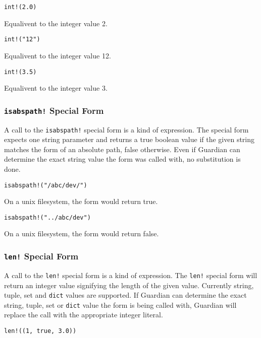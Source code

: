 {{		\begin{itemize}
		{
			\item \texttt{int!(2.0)}
			
				Equalivent to the integer value 2.
			
			\item \texttt{int!("12")}
			
				Equalivent to the integer value 12.
			
			\item \texttt{int!(3.5)}
			
				Equalivent to the integer value 3.
		}
		\end{itemize}
	}
	
	\subsubsection{\texttt{isabspath!} Special Form}
	{
		A call to the \texttt{isabspath!} special form is a kind of expression.
		The special form expects one string parameter and returns a true boolean
		value if the given string matches the form of an absolute path, false
		otherwise.
		Even if Guardian can determine the exact string value the form was
		called with, no substitution is done.
		
		\begin{itemize}
		{
			\item \texttt{isabspath!("/abc/dev/")}
			
				On a unix filesystem, the form would return true.
			
			\item \texttt{isabspath!("../abc/dev")}
			
				On a unix filesystem, the form would return false.
		}
		\end{itemize}
	}
	
	\subsubsection{\texttt{len!} Special Form}
	{
		A call to the \texttt{len!} special form is a kind of expression.
		The \texttt{len!} special form will return an integer value signifying
		the length of the given value. Currently string, tuple, set
		and \texttt{dict} values are supported.
		If Guardian can determine the exact string, tuple, set or \texttt{dict}
		value the form is being called with, Guardian will replace the call with
		the appropriate integer literal.
		
		\begin{itemize}
		{
			\item \texttt{len!((1, true, 3.0))}
			
}
\end{itemize}}}
